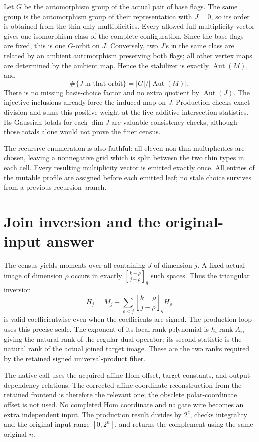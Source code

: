\documentclass[11pt]{article}
\newcommand{\Aut}{\operatorname{Aut}}
\newcommand{\rank}{\operatorname{rank}}
\newcommand{\gb}[2]{{#1\brack #2}_q}
\begin{document}
Let $G$ be the automorphism group of the actual pair of base flags.
The same group is the automorphism group of their representation with
$J=0$, so its order is obtained from the thin-only multiplicities.
Every allowed full multiplicity vector gives one isomorphism class of
the complete configuration. Since the base flags are fixed, this is
one $G$-orbit on $J$. Conversely, two $J$'s in the same class are
related by an ambient automorphism preserving both flags; all other
vertex maps are determined by the ambient map. Hence the stabilizer
is exactly $\Aut(M)$, and
\[
 \#\{J\text{ in that orbit}\}=|G|/|\Aut(M)|.
\]
There is no missing basis-choice factor and no extra quotient by
$\Aut(J)$. The injective inclusions already force the induced map on $J$.
Production checks exact division and sums this positive weight at the
five additive intersection statistics. Its Gaussian totals for each
$\dim J$ are valuable consistency checks, although those totals alone
would not prove the finer census.

The recursive enumeration is also faithful: all eleven non-thin
multiplicities are chosen, leaving a nonnegative grid which is split
between the two thin types in each cell. Every resulting multiplicity
vector is emitted exactly once. All entries of the mutable profile are
assigned before each emitted leaf; no stale choice survives from a
previous recursion branch.

\section{Join inversion and the original-input answer}
The census yields moments over all containing $J$ of dimension $j$.
A fixed actual image of dimension $\rho$ occurs in exactly
$\gb{k-\rho}{j-\rho}$ such spaces. Thus the triangular inversion
\[
 H_j=M_j-\sum_{\rho<j}\gb{k-\rho}{j-\rho}H_\rho
\]
is valid coefficientwise even when the coefficients are signed. The
production loop uses this precise scale. The exponent of its local
rank polynomial is $h_i\rank A_i$, giving the natural rank of the
regular dual operator; its second statistic is the natural rank of the
actual joined target image. These are the two ranks required by the
retained signed universal-product fiber.

The native call uses the acquired affine Hom offset, target constants,
and output-dependency relations. The corrected affine-coordinate
reconstruction from the retained frontend is therefore the relevant
one; the obsolete polar-coordinate offset is not used. No completed Hom
coordinate and no gate wire becomes an extra independent input.
The production result divides by $2^c$, checks integrality and the
original-input range $[0,2^n]$, and returns the complement using the
same original $n$.
\end{document}
